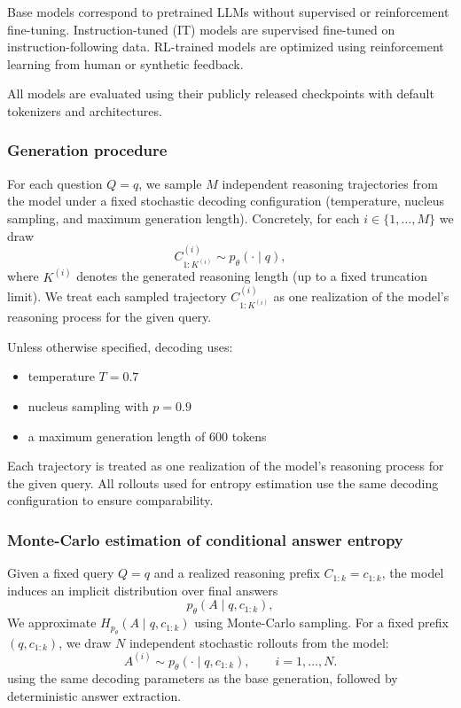 \documentclass{article}
\begin{document}
Base models correspond to pretrained LLMs without supervised or reinforcement fine-tuning. Instruction-tuned (IT) models are supervised fine-tuned on instruction-following data. RL-trained models are optimized using reinforcement learning from human or synthetic feedback.

All models are evaluated using their publicly released checkpoints with default tokenizers and architectures.

\subsubsection{Generation procedure}
\label{subsec:generation_procedure}

For each question \(Q=q\), we sample \(M\) independent reasoning trajectories from the model under a fixed stochastic decoding configuration (temperature, nucleus sampling, and maximum generation length). Concretely, for each \(i \in \{1,\dots,M\}\) we draw
\[
C^{(i)}_{1:K^{(i)}} \sim p_\theta(\cdot \mid q),
\]
where \(K^{(i)}\) denotes the generated reasoning length (up to a fixed truncation limit). We treat each sampled trajectory \(C^{(i)}_{1:K^{(i)}}\) as one realization of the model's reasoning process for the given query.

Unless otherwise specified, decoding uses:
\begin{itemize}
    \item temperature $T=0.7$
    \item nucleus sampling with $p=0.9$
    \item a maximum generation length of 600 tokens
\end{itemize}

Each trajectory is treated as one realization of the model’s reasoning process for the given query. All rollouts used for entropy estimation use the same decoding configuration to ensure comparability.


\subsubsection{Monte-Carlo estimation of conditional answer entropy}
\label{subsubsec:mc_conditional_entropy}

Given a fixed query \(Q = q\) and a realized reasoning prefix \(C_{1:k} = c_{1:k}\), the model induces an implicit distribution over final answers
\[
p_\theta(A \mid q, c_{1:k}),
\]
We approximate \(H_{p_\theta}(A \mid q, c_{1:k})\) using Monte-Carlo sampling. For a fixed prefix \((q, c_{1:k})\), we draw \(N\) independent stochastic rollouts from the model:
\[
A^{(i)} \sim p_\theta(\cdot \mid q, c_{1:k}), \qquad i = 1, \dots, N.
\]
using the same decoding parameters as the base generation, followed by deterministic answer extraction.
\end{document}
